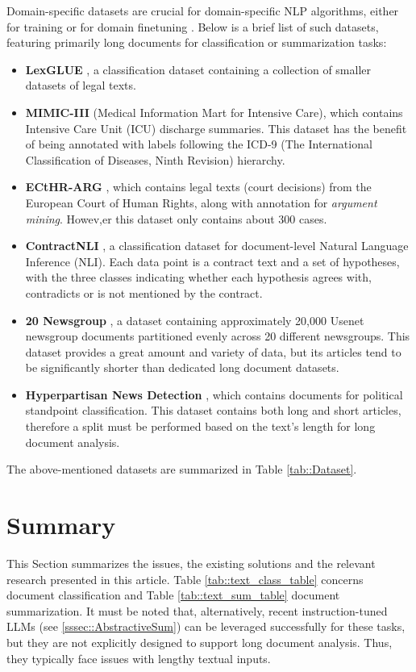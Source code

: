 \documentclass[preprint,review,10pt]{elsarticle}
\begin{document}
	Domain-specific datasets are crucial for domain-specific NLP algorithms, either for training or for domain finetuning \cite{dai}. Below is a brief list of such datasets, featuring primarily long documents for classification or summarization tasks:
	\begin{itemize}
		\item \textbf{LexGLUE} \cite{glue_gunner}, a classification dataset containing a collection of smaller datasets of legal texts.
		
		\item \textbf{MIMIC-III} \cite{mimic} (Medical Information Mart for Intensive Care), which contains Intensive Care Unit (ICU) discharge summaries. This dataset has the benefit of being annotated with labels following the ICD-9 (The International Classification of Diseases, Ninth Revision) hierarchy.
		
		\item \textbf{ECtHR-ARG} \cite{habernal}, which contains legal texts (court decisions) from the European Court of Human Rights, along with annotation for \textit{argument mining}. Howev,er this dataset only contains about 300 cases.
		
		\item \textbf{ContractNLI} \cite{koreeda}, a classification dataset for document-level Natural Language Inference (NLI). Each data point is a contract text and a set of hypotheses, with the three classes indicating whether each hypothesis agrees with, contradicts or is not mentioned by the contract.
		
		\item \textbf{20 Newsgroup} \cite{20groups}, a dataset containing approximately 20,000 Usenet newsgroup documents partitioned evenly across 20 different newsgroups. This dataset provides a great amount and variety of data, but its articles tend to be significantly shorter than dedicated long document datasets.
		
		\item \textbf{Hyperpartisan News Detection} \cite{hyperpartisan}, which contains documents for political standpoint classification. This dataset contains both long and short articles, therefore a split must be performed based on the text's length for long document analysis.
	\end{itemize}
	
	The above-mentioned datasets are summarized in Table \ref{tab::Dataset}.
	
	\section{Summary}
	\label{sec::Summary}
	This Section summarizes the issues, the existing solutions and the relevant research presented in this article. Table \ref{tab::text_class_table} concerns document classification and Table \ref{tab::text_sum_table} document summarization. It must be noted that, alternatively, recent instruction-tuned LLMs (see \ref{sssec::AbstractiveSum}) can be leveraged successfully for these tasks, but they are not explicitly designed to support long document analysis. Thus, they typically face issues with lengthy textual inputs.
	
\end{document}
